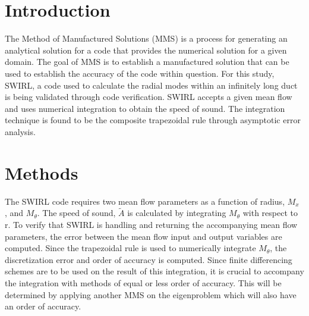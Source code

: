 \documentclass[12pt]{article}
\begin{document}







\section{Introduction}
The Method of Manufactured Solutions (MMS) is a process for generating an 
analytical solution for a code that provides the numerical solution for a 
given domain. The goal of MMS is to establish a manufactured solution that can 
be used to establish the accuracy of the code within question. For this study, 
SWIRL, a code used to calculate the radial modes within an infinitely long duct
is being validated through code verification. SWIRL accepts a given mean flow and 
uses numerical integration to obtain the speed of sound. The integration technique
is found to be the composite trapezoidal rule through asymptotic error analysis.


\section{Methods}
The SWIRL code requires two mean flow parameters as a function of radius, $M_x$
, and $M_{\theta}$. The speed of sound, $\widetilde{A}$ is calculated by 
integrating $M_{\theta}$ with respect to r. To verify that SWIRL is handling 
and returning the accompanying mean flow parameters, the error between the 
mean flow input and output variables are computed. Since the trapezoidal rule
is used to numerically integrate $M_{\theta}$, the discretization error and 
order of accuracy is computed. Since finite differencing schemes are to be used 
on the result of this integration, it is crucial to accompany the integration 
with methods of equal or less order of accuracy. This will be determined by 
applying another MMS on the eigenproblem which will also have an order of 
accuracy.
\end{document}

